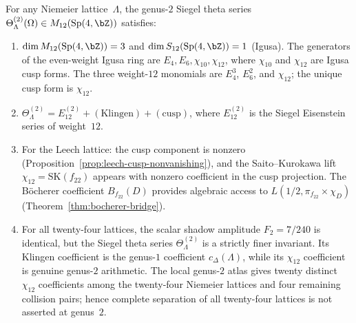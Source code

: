 \begin{theorem}%
\label{thm:lattice:niemeier-siegel-genus2}%
%
%
%
For any Niemeier lattice~$\Lambda$, the genus-$2$ Siegel theta series
$\Theta_\Lambda^{(2)}(\Omega) \in M_{12}(\mathrm{Sp}(4,\bZ))$
satisfies:
\begin{enumerate}[label=\textup{(\roman*)}]
\item $\dim M_{12}(\mathrm{Sp}(4,\bZ)) = 3$ and
$\dim S_{12}(\mathrm{Sp}(4,\bZ)) = 1$
\textup{(}Igusa\textup{)}.
The generators of the even-weight Igusa ring are
$E_4, E_6, \chi_{10}, \chi_{12}$, where $\chi_{10}$
and $\chi_{12}$ are Igusa cusp forms.
The three weight-$12$ monomials are $E_4^3$, $E_6^2$,
and $\chi_{12}$; the unique cusp form is $\chi_{12}$.
\item $\Theta_\Lambda^{(2)} = E_{12}^{(2)} + (\text{Klingen}) +
(\text{cusp})$, where $E_{12}^{(2)}$ is the Siegel Eisenstein
series of weight~$12$.
\item For the Leech lattice: the cusp component is nonzero
\textup{(}Proposition~\textup{\ref{prop:leech-cusp-nonvanishing}}\textup{)},
and the Saito--Kurokawa lift $\chi_{12} = \mathrm{SK}(f_{22})$
appears with nonzero coefficient in the cusp projection.
The B\"ocherer coefficient $B_{f_{22}}(D)$ provides
algebraic access to $L(1/2, \pi_{f_{22}} \times \chi_D)$
\textup{(}Theorem~\textup{\ref{thm:bocherer-bridge}}\textup{)}.
\item For all twenty-four lattices, the scalar shadow amplitude
$F_2 = 7/240$ is identical, but the Siegel theta series
$\Theta_\Lambda^{(2)}$ is a strictly finer invariant. Its Klingen
coefficient is the genus-$1$ coefficient $c_\Delta(\Lambda)$, while
its $\chi_{12}$ coefficient is genuine genus-$2$ arithmetic. The
local genus-$2$ atlas gives twenty distinct $\chi_{12}$ coefficients
among the twenty-four Niemeier lattices and four remaining collision
pairs; hence complete separation of all twenty-four lattices is not
asserted at genus~$2$.
\end{enumerate}
\end{theorem}

